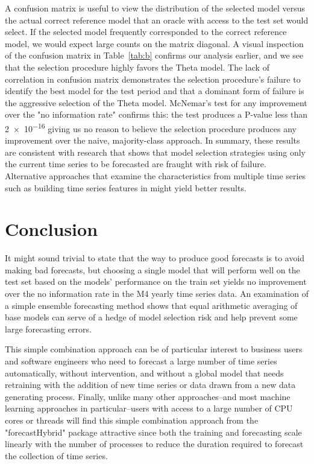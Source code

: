 \documentclass[11pt,3p,review,authoryear]{elsarticle}
\begin{document}
A confusion matrix is useful to view the distribution of the selected model versus the actual correct reference model that an oracle with access to the test set would select. If the selected model frequently corresponded to the correct reference model, we would expect large counts on the matrix diagonal. A visual inspection of the confusion matrix in Table~\ref{tab:b} confirms our analysis earlier, and we see that the selection procedure highly favors the Theta model. The lack of correlation in confusion matrix demonstrates the selection procedure's failure to identify the best model for the test period and that a dominant form of failure is the aggressive selection of the Theta model. McNemar's test \citep{MCNEMAR} for any improvement over the "no information rate" confirms this: the test produces a P-value less than \num{2e-16} giving us no reason to believe the selection procedure produces any improvement over the naive, majority-class approach. In summary, these results are consistent with research that shows that model selection strategies using only the current time series to be forecasted are fraught with risk of failure. Alternative approaches that examine the characteristics from multiple time series such as building time series features in \cite{modelSelection} might yield better results.



\section{Conclusion}
It might sound trivial to state that the way to produce good forecasts is to avoid making bad forecasts, but choosing a single model that will perform well on the test set based on the models' performance on the train set yields no improvement over the no information rate in the M4 yearly time series data. An examination of a simple ensemble forecasting method shows that equal arithmetic averaging of base models can serve of a hedge of model selection risk and help prevent some large forecasting errors.


This simple combination approach can be of particular interest to business users and software engineers who need to forecast a large number of time series automatically, without intervention, and without a global model that needs retraining with the addition of new time series or data drawn from a new data generating process. Finally, unlike many other approaches--and most machine learning approaches in particular--users with access to a large number of CPU cores or threads will find this simple combination approach from the "forecastHybrid" package attractive since both the training and forecasting scale linearly with the number of processes to reduce the duration required to forecast the collection of time series.
\end{document}
